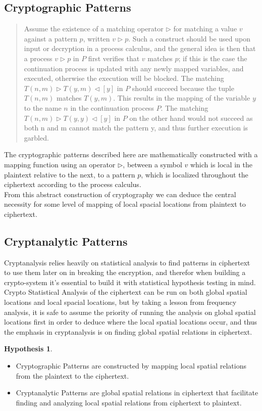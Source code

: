 \documentclass[a4paper, 12pt]{report}
\newtheorem{hypothesis}{Hypothesis}
\begin{document}
\subsection*{\textbf{Cryptographic Patterns}}
\blockquote{Assume the existence of a matching operator $ \rhd $ for matching a value
$ v $ against a pattern $ p $, written $ v \rhd p $. Such a construct should be used upon input or decryption in a process calculus, and the general idea is then that a process $ v \rhd p $ in $ P $ first verifies that $ v $ matches $ p $; if this is the case the continuation process is updated with any newly mapped variables, and executed, otherwise the execution will be blocked.
The matching $ T(n, m) \rhd T(y, m) \lhd [y] $ in $ P $ should succeed because the tuple $ T(n, m) $ matches $ T(y, m) $. This results in the mapping of the variable $ y $ to the name $ n $ in the continuation process $ P $. The matching $ T(n, m) \rhd T(y, y) \lhd [y] $ in $ P $ on the other hand would not succeed as both n and m cannot match the pattern y, and thus further execution is garbled.~\citep{Nielsen2007CryptographicPM}}
The cryptographic patterns described here are mathematically constructed with a mapping function using an operator $ \rhd $, between a symbol $ v $ which is local in the plaintext relative to the next, to a pattern $ p $, which is localized throughout the ciphertext according to the process calculus.\\
From this abstract construction of cryptography we can deduce the central necessity for some level of mapping of local spacial locations from plaintext to ciphertext.
\subsection*{\textbf{Cryptanalytic Patterns}}
Cryptanalysis relies heavily on statistical analysis to find patterns in ciphertext to use them later on in breaking the encryption, and therefor when building a crypto-system it's essential to build it with statistical hypothesis testing in mind.\citep{7031850}\\
Crypto Statistical Analysis of the ciphertext can be run on both global spatial locations and local spacial locations, but by taking a lesson from frequency analysis, it is safe to assume the priority of running the analysis on global spatial locations first in order to deduce where the local spatial locations occur, and thus the emphasis in cryptanalysis is on finding global spatial relations in ciphertext.\\
\begin{hypothesis}\end{hypothesis}
	\begin{itemize}[nosep]
		\item Cryptographic Patterns are constructed by mapping local spatial relations from the plaintext to the ciphertext.
		\item Cryptanalytic Patterns are global spatial relations in ciphertext that facilitate finding and analyzing local spatial relations from ciphertext to plaintext. 
	\end{itemize}
\newpage
\end{document}
